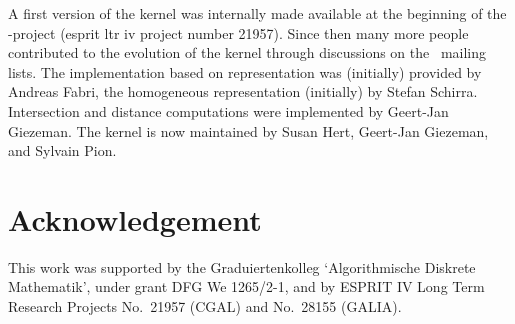 A first version of the kernel was internally made available at the beginning
of the \cgal-project ({\sc esprit ltr iv} project number 21957).
Since then many more people contributed to the evolution of the kernel
through discussions on the \cgal\ mailing lists.
The implementation based on 
 representation was (initially) provided 
by Andreas Fabri, the homogeneous representation (initially) by Stefan Schirra.
Intersection and distance computations were implemented by Geert-Jan Giezeman.
The kernel is now maintained by Susan Hert, Geert-Jan Giezeman, and
Sylvain Pion.

\section*{Acknowledgement}

This work was supported
by the Graduiertenkolleg `Algorithmische Diskrete Mathematik',
under grant DFG We 1265/2-1,
and by ESPRIT IV Long Term Research Projects No.~21957 (CGAL)
and No.~28155 (GALIA).

